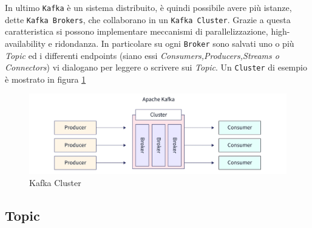 In ultimo \texttt{Kafka} è un sistema distribuito, è quindi possibile avere più istanze, dette \texttt{Kafka Brokers}, che collaborano in un \texttt{Kafka Cluster}. Grazie a questa caratteristica si possono implementare meccanismi di parallelizzazione, high-availability e ridondanza.
In particolare su ogni \texttt{Broker} sono salvati uno o più \textit{Topic} ed i differenti endpoints (siano essi \textit{Consumers,Producers,Streams o Connectors}) vi dialogano per leggere o scrivere sui \textit{Topic}.
Un \texttt{Cluster} di esempio è mostrato in figura \ref{fig:kafka_cluster}
\begin{figure}[htbp]
    \centering
    \includegraphics[width=\textwidth]{images/kafka/cluster.jpg}
    \caption{Kafka Cluster}
    \label{fig:kafka_cluster}
\end{figure}

\subsection{Topic}
\label{subsec:kafka_topics}

